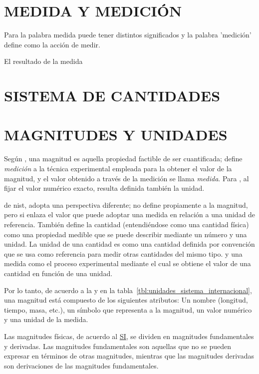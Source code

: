 \section{MEDIDA Y MEDICIÓN}
  Para \parencite{bib:} la palabra medida puede tener distintos significados y la palabra 'medición' define como la acción de medir.

  El resultado de la medida 
\section{SISTEMA DE CANTIDADES}
  

\section{MAGNITUDES Y UNIDADES}
  \label{sec:magnitudes_unidades}

  Según \parencite{bib:AlvarezHuayta2014}, una magnitud es aquella propiedad factible de ser cuantificada; define \textit{medición} a la técnica experimental empleada para la obtener el valor de la magnitud, y el valor obtenido a través de la medición se llama \textit{medida}. Para \parencite{bib:siu_spain2019}, al fijar el valor numérico exacto, resulta definida también la unidad. %

  \parencite[p. 2]{bib:siu_newell2019the} de \gls{nist}, adopta una perspectiva diferente; no define propiamente a la magnitud, pero si enlaza el valor que puede adoptar una medida en relación a una unidad de referencia. También define la cantidad (entendiéndose como una cantidad física) como una propiedad medible que se puede describir mediante un número y una unidad. La unidad de una cantidad es como una cantidad definida por convención que se usa como referencia para medir otras cantidades del mismo tipo. y una medida como el proceso experimental mediante el cual se obtiene el valor de una cantidad en función de una unidad.


  Por lo tanto, de acuerdo a la \parencite{bib:AlvarezHuayta2014} y 
  en la tabla~\ref{tbl:unidades_sistema_internacional}, una magnitud está compuesto 
  de los siguientes atributos: Un nombre (longitud, tiempo, masa, etc.), un 
  símbolo que representa a la magnitud, un valor numérico y una unidad de la medida. 

  Las magnitudes físicas, de acuerdo al \href{https://www.bipm.org/en/measurement-units}{SI}, se dividen en magnitudes fundamentales y derivadas. Las magnitudes fundamentales son aquellas que no se pueden expresar en términos de otras magnitudes, mientras que las magnitudes derivadas son derivaciones de las magnitudes fundamentales.


